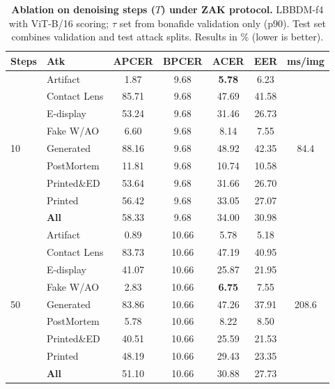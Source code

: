 \begin{table}[!htbp]
\centering
\scriptsize
\setlength{\tabcolsep}{3pt}
\caption{\textbf{Ablation on denoising steps ($T$) under ZAK protocol.}
LBBDM-f4 with ViT-B/16 scoring; $\tau$ set from bonafide validation only (p90).
Test set combines validation and test attack splits. Results in \% (lower is better).}
\label{tab:ablation_study2_zak}

\begin{tabular}{l l c c c c c}
\toprule
\textbf{Steps} & \textbf{Atk} & APCER & BPCER & ACER & EER & ms/img \\
\midrule

\multirow{9}{*}{10}
& Artifact             &   1.87 &   9.68 &  \textbf{5.78} &    6.23 & \multirow{9}{*}{84.4} \\
& Contact Lens         &  85.71 &   9.68 &          47.69 &   41.58 &  \\
& E-display            &  53.24 &   9.68 &          31.46 &   26.73 &  \\
& Fake W/AO            &   6.60 &   9.68 &           8.14 &    7.55 &  \\
& Generated            &  88.16 &   9.68 &          48.92 &   42.35 &  \\
& PostMortem           &  11.81 &   9.68 &          10.74 &   10.58 &  \\
& Printed\&ED          &  53.64 &   9.68 &          31.66 &   26.70 &  \\
& Printed              &  56.42 &   9.68 &          33.05 &   27.07 &  \\
& \textbf{All}             &  58.33 &   9.68 &          34.00 &   30.98 & \\
\midrule

\multirow{9}{*}{50}
& Artifact             &   0.89 &  10.66 &           5.78 &    5.18 & \multirow{9}{*}{208.6} \\
& Contact Lens         &  83.73 &  10.66 &          47.19 &   40.95 &  \\
& E-display            &  41.07 &  10.66 &          25.87 &   21.95 &  \\
& Fake W/AO            &   2.83 &  10.66 &  \textbf{6.75} &    7.55 &  \\
& Generated            &  83.86 &  10.66 &          47.26 &   37.91 &  \\
& PostMortem           &   5.78 &  10.66 &           8.22 &    8.50 &  \\
& Printed\&ED          &  40.51 &  10.66 &          25.59 &   21.53 &  \\
& Printed              &  48.19 &  10.66 &          29.43 &   23.35 &  \\
& \textbf{All}             &  51.10 &  10.66 &          30.88 &   27.73 & \\
\midrule


\end{tabular}
\end{table}

